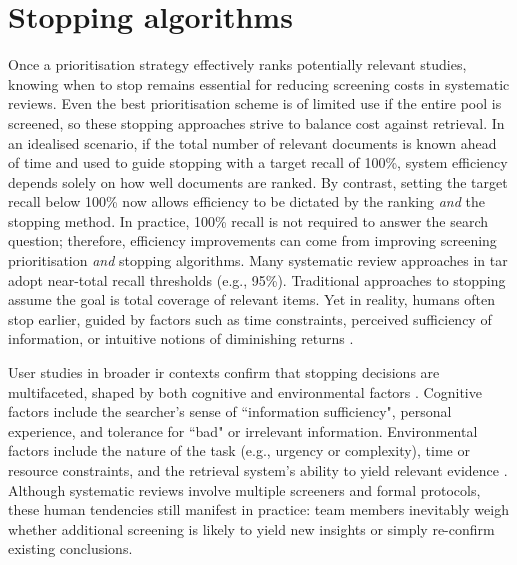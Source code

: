 \documentclass[10pt,oneside]{book}
\begin{document}



\section{Stopping algorithms}\label{sec:Stopping_algorithms}

Once a prioritisation strategy effectively ranks potentially relevant studies, knowing when to stop remains essential for reducing screening costs in systematic reviews. Even the best prioritisation scheme is of limited use if the entire pool is screened, so these stopping approaches strive to balance cost against retrieval. In an idealised scenario, if the total number of relevant documents is known ahead of time and used to guide stopping with a target recall of 100\%, system efficiency depends solely on how well documents are ranked. By contrast, setting the target recall below 100\% now allows efficiency to be dictated by the ranking \emph{and} the stopping method. In practice, 100\% recall is not required to answer the search question; therefore, efficiency improvements can come from improving screening prioritisation \emph{and} stopping algorithms. Many systematic review approaches in \gls*{tar} adopt near-total recall thresholds (e.g., 95\%). Traditional approaches to stopping assume the goal is total coverage of relevant items. Yet in reality, humans often stop earlier, guided by factors such as time constraints, perceived sufficiency of information, or intuitive notions of diminishing returns \cite{ilani_analysis_2024, browne_cognitive_2007, wu_online_2014}.

User studies in broader \gls*{ir} contexts confirm that stopping decisions are multifaceted, shaped by both cognitive and environmental factors \cite{ilani_analysis_2024}. Cognitive factors include the searcher’s sense of ``information sufficiency", personal experience, and tolerance for ``bad" or irrelevant information. Environmental factors include the nature of the task (e.g., urgency or complexity), time or resource constraints, and the retrieval system's ability to yield relevant evidence \cite{prabha_what_2007}. Although systematic reviews involve multiple screeners and formal protocols, these human tendencies still manifest in practice: team members inevitably weigh whether additional screening is likely to yield new insights or simply re-confirm existing conclusions.
\end{document}
